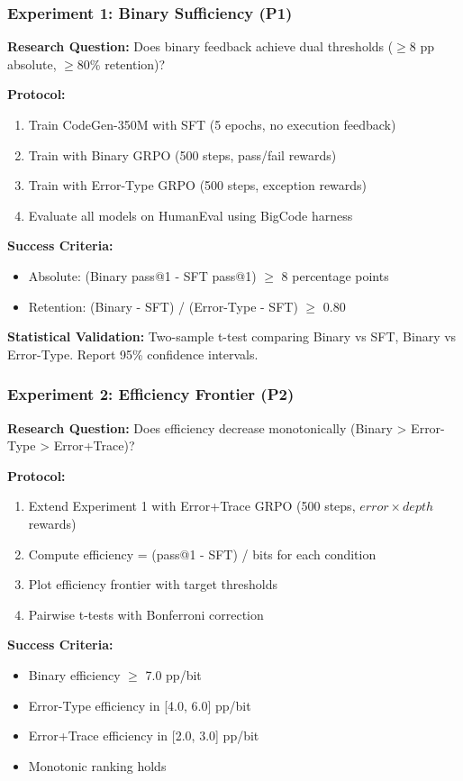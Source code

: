 \subsubsection{Experiment 1: Binary Sufficiency (P1)}

\textbf{Research Question:} Does binary feedback achieve dual thresholds ($\geq 8$ pp absolute, $\geq 80$\% retention)?

\textbf{Protocol:}
\begin{enumerate}
\item Train CodeGen-350M with SFT (5 epochs, no execution feedback)
\item Train with Binary GRPO (500 steps, pass/fail rewards)
\item Train with Error-Type GRPO (500 steps, exception rewards)
\item Evaluate all models on HumanEval using BigCode harness
\end{enumerate}

\textbf{Success Criteria:}
\begin{itemize}
\item Absolute: (Binary pass@1 - SFT pass@1) $\geq$ 8 percentage points
\item Retention: (Binary - SFT) / (Error-Type - SFT) $\geq$ 0.80
\end{itemize}

\textbf{Statistical Validation:} Two-sample t-test comparing Binary vs SFT, Binary vs Error-Type. Report 95\% confidence intervals.

\subsubsection{Experiment 2: Efficiency Frontier (P2)}

\textbf{Research Question:} Does efficiency decrease monotonically (Binary > Error-Type > Error+Trace)?

\textbf{Protocol:}
\begin{enumerate}
\item Extend Experiment 1 with Error+Trace GRPO (500 steps, $error\times depth$ rewards)
\item Compute efficiency = (pass@1 - SFT) / bits for each condition
\item Plot efficiency frontier with target thresholds
\item Pairwise t-tests with Bonferroni correction
\end{enumerate}

\textbf{Success Criteria:}
\begin{itemize}
\item Binary efficiency $\geq$ 7.0 pp/bit
\item Error-Type efficiency in [4.0, 6.0] pp/bit
\item Error+Trace efficiency in [2.0, 3.0] pp/bit
\item Monotonic ranking holds
\end{itemize}

